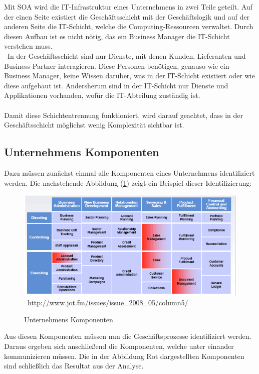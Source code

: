 Mit SOA wird die IT-Infrastruktur eines Unternehmens in zwei Teile geteilt. Auf der einen Seite existiert die Geschäftsschicht mit der Geschäftslogik und auf der anderen Seite die IT-Schicht, welche die Computing-Ressourcen verwaltet. Durch diesen Aufbau ist es nicht nötig, das ein Business Manager die IT-Schicht verstehen muss.
\\\
In der Geschäftsschicht sind nur Dienste, mit denen Kunden, Lieferanten und Business Partner interagieren. Diese Personen benötigen, genauso wie ein Business Manager, keine Wissen darüber, was in der IT-Schicht existiert oder wie diese aufgebaut ist. Andersherum sind in der IT-Schicht nur Dienste und Applikationen vorhanden, wofür die IT-Abteilung zuständig ist.
\\\\
Damit diese Schichtentrennung funktioniert, wird darauf geachtet, dass in der Geschäftsschicht möglichst wenig Komplexität sichtbar ist.

\subsection{Unternehmens Komponenten}
\label{subsec:UnternehmensKomponenten}
Dazu müssen zunächst einmal alle Komponenten eines Unternehmens identifiziert werden. Die nachstehende Abbildung (\ref{fig:UnternehmensKomponenten}) zeigt ein Beispiel dieser Identifizierung:

\begin{figure}[htb]
    \centering 
    \includegraphics[width=\linewidth]{content/images/UnternehmensKomponenten}\
    \quelle\url{http://www.jot.fm/issues/issue_2008_05/column5/}
    \caption[Unternehmens Komponenten]{Unternehmens Komponenten\\}
    \label{fig:UnternehmensKomponenten}  
\end{figure} 
\newpage
Aus diesen Komponenten müssen nun die Geschäftsprozesse identifiziert werden. Daraus ergeben sich anschließend die Komponenten, welche unter einander kommunizieren müssen. Die in der Abbildung Rot dargestellten Komponenten sind schließlich das Resultat aus der Analyse.

